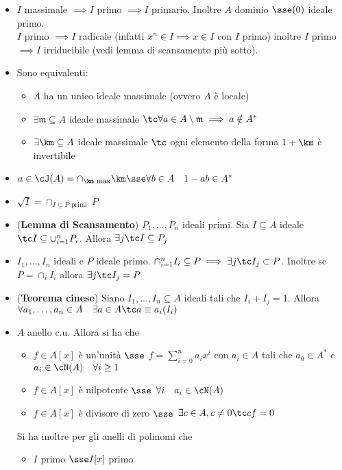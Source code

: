 \documentclass[a4paper,NoNotes,GeneralMath]{stdmdoc}
\begin{document}
\begin{itemize}
		\item $I$ massimale $\implies I$ primo $\implies I$ primario. Inoltre $A$ dominio $\sse (0)$ ideale primo. \\
			$I$ primo $\implies I$ radicale (infatti $x^n \in I \implies x \in I$ con $I$ primo) inoltre $I$ primo $\implies I$ irriducibile (vedi lemma di scansamento più sotto).
		\item Sono equivalenti:
			\begin{itemize}
				\item $A$ ha un unico ideale massimale (ovvero $A$ è locale)
				\item $\exists \mathfrak{m} \subseteq A$ ideale massimale $\tc \forall a \in A \setminus \mathfrak{m} \implies a \notin A^*$
				\item $\exists \km \subseteq A$ ideale massimale $\tc$ ogni elemento della forma $1 + \km$ è invertibile
			\end{itemize}
		\item $a \in \cJ(A) = \cap_{\km \text{ max}} \km \sse \forall b \in A \quad 1-ab \in A^*$
		\item $\sqrt{I} = \cap_{I \subseteq P \text{ primi }} P$
		\item ({\bf Lemma di Scansamento}) $P_1, \ldots, P_n$ ideali primi. Sia $I \subseteq A$ ideale $\tc I \subseteq \cup_{i=1}^n P_i$. Allora $\exists j \tc I \subseteq P_j$
		\item $I_1, \ldots, I_n$ ideali e $P$ ideale primo. $\cap_{i=1}^n I_i \subseteq P \implies \exists j \tc I_j \subset P$. Inoltre se $P = \cap_i I_i$ allora $\exists j \tc I_j = P$
		\item ({\bf Teorema cinese}) Siano $I_1, \ldots, I_n \subseteq A$ ideali tali che $I_i + I_j = 1$. Allora $\forall a_1, \ldots, a_n \in A \quad \exists a \in A \tc a \equiv a_i (I_i)$
		\item $A$ anello c.u. Allora si ha che
			\begin{itemize}
				\item $f \in A[x]$ è un'unità $\sse$ $f = \sum_{i=0}^n a_i x^i$ con $a_i \in A$ tali che $a_0 \in A^*$ e $a_i \in \cN(A) \quad \forall i \ge 1$
				\item $f \in A[x]$ è nilpotente $\sse$ $\forall i \quad a_i \in \cN(A)$
				\item $f \in A[x]$ è divisore di zero $\sse$ $\exists c \in A, c \neq 0 \tc cf = 0$
			\end{itemize}
			Si ha inoltre per gli anelli di polinomi che
			\begin{itemize}
				\item $I$ primo $\sse I[x]$ primo

\end{itemize}
\end{itemize}
\end{document}
